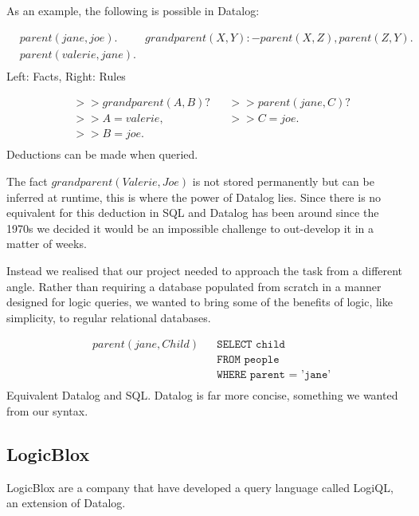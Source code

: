 \documentclass[a4paper, 11pt]{article}
\begin{document}
    As an example, the following is possible in Datalog:
    \begin{center}
      \begin{align*}
        &parent(jane, joe). & grandparent(X, Y) :- parent(X, Z), parent(Z, Y).\\
        &parent(valerie, jane). & \\
      \end{align*}
      Left: Facts, Right: Rules

      \begin{align*}
        &>> grandparent(A, B)?  & & >> parent(jane, C)? \\
        &>> A = valerie,        & & >> C = joe. \\
        &>> B = joe.            & & \\
      \end{align*}
      Deductions can be made when queried.
    \end{center}

    The fact $grandparent(Valerie, Joe)$ is not stored permanently but can be
    inferred at runtime, this is where the power of Datalog lies. Since there is no
    equivalent for this deduction in SQL and Datalog has been around since the 1970s
    we decided it would be an impossible challenge to out-develop it in a matter of
    weeks.

    Instead we realised that our project needed to approach the task from a
    different angle. Rather than requiring a database populated from scratch in a
    manner designed for logic queries, we wanted to bring some of the benefits of
    logic, like simplicity, to regular relational databases.
    \begin{center}
      \begin{align*}
        & parent(jane, Child) & & \texttt{SELECT child} \\
        &                     & & \texttt{FROM people} \\
        &                     & & \texttt{WHERE parent = 'jane'} \\
      \end{align*}
      Equivalent Datalog and SQL. Datalog is far more concise, something we wanted from our syntax.
    \end{center}

  \subsection{LogicBlox}
  LogicBlox are a company that have developed a query language called LogiQL, an extension of Datalog. \cite{logicblox}
\end{document}
